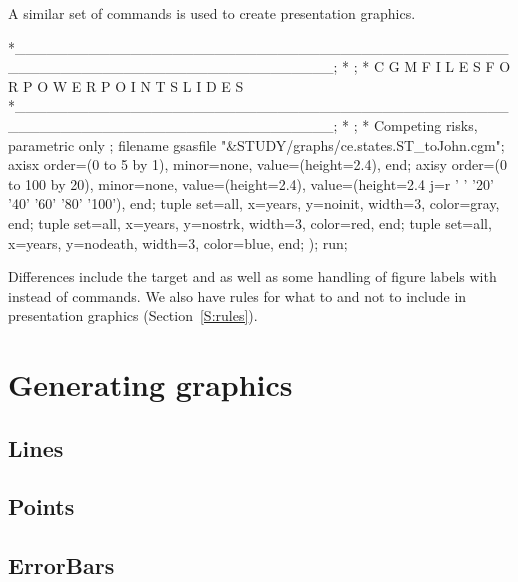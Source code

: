 \documentclass[nojss]{jss}\usepackage[]{graphicx}\usepackage[]{color}
\begin{document}
A similar set of  commands is used to create presentation graphics.
\begin{CodeChunk}\small
\begin{CodeInput}
*______________________________________________________________________________;
*                                                                              ;
*       C G M   F I L E S   F O R   P O W E R P O I N T   S L I D E S
*______________________________________________________________________________;
*                                                                              ;
* Competing risks, parametric only                                             ;
filename gsasfile "&STUDY/graphs/ce.states.ST_toJohn.cgm";
axisx order=(0 to 5 by 1), minor=none, value=(height=2.4), end;
axisy order=(0 to 100 by 20), minor=none, value=(height=2.4), 
value=(height=2.4 j=r ' ' '20' '40' '60' '80' '100'), end;
tuple set=all, x=years, y=noinit, width=3, color=gray, end;
tuple set=all, x=years, y=nostrk, width=3, color=red, end;
tuple set=all, x=years, y=nodeath, width=3, color=blue, end;
);
run;  
\end{CodeInput}
\end{CodeChunk}
Differences include the target  and  as well as some handling of figure labels with  instead of  commands. We also have rules for what to and not to include in presentation graphics (Section~\ref{S:rules}).

\section[Generating ggplot2 graphics]{Generating  graphics}\label{S:ggplot2tuple}

\subsection{Lines}\label{S:lines}

\subsection{Points}\label{S:points}


\subsection{ErrorBars}\label{S:errorbars}
\end{document}
